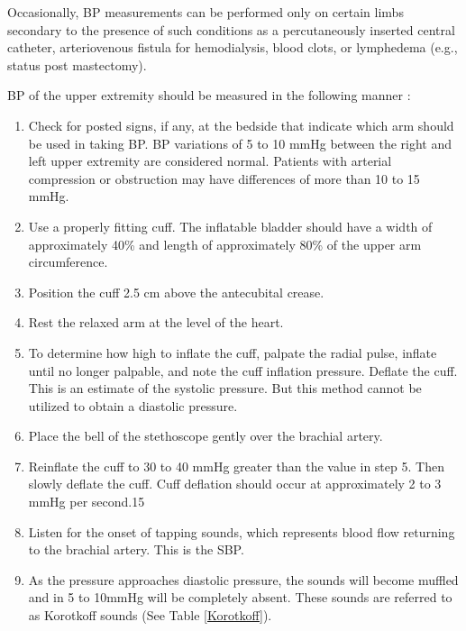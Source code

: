 Occasionally, BP measurements can be performed only on certain limbs secondary to the presence of such conditions as a percutaneously inserted central catheter, arteriovenous fistula for hemodialysis, blood clots, or lymphedema (e.g., status post mastectomy). 

BP of the upper extremity should be measured in the following manner \cite{collins_cardiac_2019}:

\begin{enumerate}
\item Check for posted signs, if any, at the bedside that indicate which arm should be used in taking BP. BP variations of 5 to 10 mmHg between the right and left upper extremity are considered normal. Patients with arterial compression or obstruction may have differences of more than 10 to 15 mmHg.
\item Use a properly fitting cuff. The inflatable bladder should have a width of approximately 40\% and length of approximately 80\% of the upper arm circumference.
\item Position the cuff 2.5 cm above the antecubital crease.
\item Rest the relaxed arm at the level of the heart.
\item To determine how high to inflate the cuff, palpate the radial pulse, inflate until no longer palpable, and note the cuff inflation pressure. Deflate the cuff. This is an estimate of the systolic pressure. But this method cannot be utilized to obtain a diastolic pressure.
\item Place the bell of the stethoscope gently over the brachial artery.
\item Reinflate the cuff to 30 to 40 mmHg greater than the value in step 5. Then slowly deflate the cuff. Cuff deflation should occur at approximately 2 to 3 mmHg per second.15
\item Listen for the onset of tapping sounds, which represents blood flow returning to the brachial artery. This is the SBP.
\item As the pressure approaches diastolic pressure, the sounds will become muffled and in 5 to 10mmHg will be completely absent. These sounds are referred to as Korotkoff sounds (See Table \ref{Korotkoff}).
\end{enumerate}

